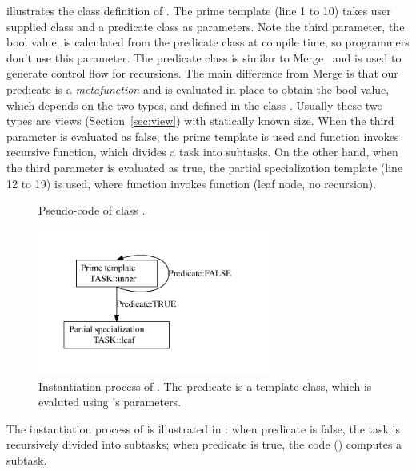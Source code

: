  illustrates the class definition of . The
prime template (line 1 to 10) takes  user supplied 
class and a predicate class as parameters. Note the third parameter, the bool value,
is calculated from the predicate class at compile time, so programmers don't
use this parameter. 
The predicate class is similar to Merge~\cite{merge} and is used to generate
control flow for recursions. The main difference from Merge is that our predicate is a
\emph{metafunction} and is evaluated in place to obtain the bool value, which
depends on the two types,  and 
defined in the class . Usually these two types are views (Section~\ref{sec:view})
with statically known size. When the third parameter is evaluated as false, the
prime template is used and  function invokes recursive
 function, which divides a task into subtasks.
On the other hand, when the third parameter is evaluated as true, the partial
specialization template (line 12 to 19) is used, where  function
invokes  function (leaf node, no recursion).


\begin{figure}[hbt]
  \caption{Pseudo-code of class .}
  \label{fig:tf:code}
\end{figure}

\begin{figure}[hpt]
  \includegraphics[width=3.0in]{../algo}
  \caption{Instantiation process of . The predicate is a template
class, which is evaluted using 's parameters.}
  \label{fig:hierarchy}
\end{figure}

The instantiation process of  is illustrated in :
when predicate is false, the task is recursively divided into subtasks; when predicate
is true, the code () computes a subtask.


